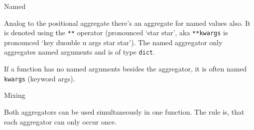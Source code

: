 \begin{frame}[fragile]

\begin{block}{Named}

Analog to the positional aggregate there's an aggregate for named values
also. It is denoted using the \texttt{**} operator (pronounced `star
star', aka \texttt{**kwargs} is pronounced `key duouble u args star
star'). The named aggregator only aggregates named arguments and is of
type \texttt{dict}.

\begin{Shaded}
\begin{Highlighting}[]
 

\NormalTok{)  }
\NormalTok{)  }
\NormalTok{)  }
\NormalTok{)  }
\end{Highlighting}
\end{Shaded}

If a function has no named arguments besides the aggregator, it is often
named \texttt{kwargs} (keyword args).

\end{block}

\end{frame}

\begin{frame}[fragile]

\begin{block}{Mixing}

Both aggregators can be used simultaneously in one function. The rule
is, that each aggregator can only occur once.

\begin{Shaded}
\begin{Highlighting}[]
 
        \NormalTok{,}
        \NormalTok{,}
    \NormalTok{):}
\end{Highlighting}
\end{Shaded}

\end{block}

\end{frame}


